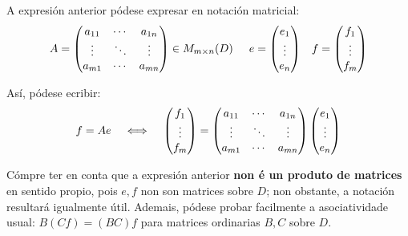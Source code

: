 \documentclass[twoside]{report}
\theoremstyle{mystyle}
\begin{document}
\noindent A expresión anterior pódese expresar en notación matricial:\\

$$
A = \begin{pmatrix}
a_{11} & \cdots & a_{1n}\\
\vdots & \ddots & \vdots\\
a_{m1} & \cdots & a_{mn}
\end{pmatrix} \in M_{m \times n}(D)
\hspace{5mm}
e = \begin{pmatrix}
e_{1} \\ \vdots \\ e_{n}
\end{pmatrix}
\hspace{3mm}
f = \begin{pmatrix}
f_{1} \\ \vdots \\ f_{m}
\end{pmatrix}
$$

\vspace{5mm}

\noindent Así, pódese ecribir:\\

$$
f = Ae \hspace{4mm} \Longleftrightarrow \hspace{4mm}
\begin{pmatrix}
f_{1} \\ \vdots \\ f_{m}
\end{pmatrix}
=
\begin{pmatrix}
a_{11} & \cdots & a_{1n}\\
\vdots & \ddots & \vdots\\
a_{m1} & \cdots & a_{mn}
\end{pmatrix} 
\begin{pmatrix}
e_{1} \\ \vdots \\ e_{n}
\end{pmatrix}
$$

\vspace{3mm}

\noindent Cómpre ter en conta que a expresión anterior \textbf{non é un produto de matrices} en sentido propio, pois $e,f$ non son matrices sobre $D$; non obstante, a notación resultará igualmente útil. Ademais, pódese probar facilmente a asociatividade usual: $B(Cf) = (BC)f$ para matrices ordinarias $B,C$ sobre $D$.\\
\end{document}
